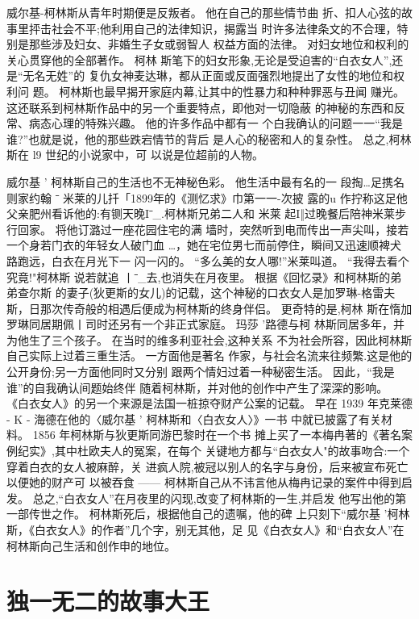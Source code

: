 \documentclass[portrait,a4paper]{article}
\begin{document}
威尔基-柯林斯从青年时期便是反叛者。 他在自己的那些情节曲
折、扣人心弦的故事里抨击社会不平;他利用自己的法律知识，揭露当
时许多法律条文的不合理，特别是那些涉及妇女、非婚生子女或弱智人
权益方面的法律。 对妇女地位和权利的关心贯穿他的全部著作。 柯林
斯笔下的妇女形象,无论是受迫害的“白衣女人”,还是“无名无姓”的
复仇女神麦达琳，都从正面或反面强烈地提出了女性的地位和权利问
题。 柯林斯也最早揭开家庭内幕,让其中的性暴力和种种罪恶与丑闻
赚光。 这还联系到柯林斯作品中的另一个重要特点，即他对一切隐蔽
的神秘的东西和反常、病态心理的特殊兴趣。 他的许多作品中都有一
个白我确认的问题一一“我是谁?”也就是说，他的那些跌宕情节的背后
是人心的秘密和人的复杂性。 总之,柯林斯在 l9 世纪的小说家中，可
以说是位超前的人物。

威尔基 ' 柯林斯自己的生活也不无神秘色彩。 他生活中最有名的一
段掏…足携名则家约翰 ˉ 米莱的儿扦「1899年的《测忆求》巾第一一-次披
露的u 作拧称这足他父亲肥州看诉他的:有铡天晚Iˉ_.柯林斯兄弟二人和
米莱 起I‖过晚餐后陪神米莱步行回家。 将他订潞过一座花园住宅的满
墙时，突然听到电而传出一声尖叫，接若一个身若门衣的年轻女人破门血
…，她在宅位男七而前停住，瞬间又迅速顺裨犬路跑远，白衣在月光下一
闪一闪的。 “多么美的女人哪!”米莱叫道。 “我得去看个究竟!"柯林斯
说若就追 丨ˉ_去,也消失在月夜里。 根据《回忆录》和柯林斯的弟弟查尔斯
的妻子(狄更斯的女儿)的记载，这个神秘的口衣女人是加罗琳-格雷夫
斯，日那次传奇般的相遇后便成为柯林斯的终身伴侣。 更奇特的是,柯林
斯在惰加罗琳同居期佩丨司时还另有一个非正式家庭。 玛莎 '路德与柯
林斯同居多年，并为他生了三个孩子。 在当时的维多利亚社会,这种关系
不为社会所容，因此柯林斯自己实际上过着三重生活。 一方面他是著名
作家，与社会名流来往频繁.这是他的公开身份;另一方面他同时又分别
跟两个情妇过着一种秘密生活。 因此，“我是谁”的自我确认间题始终伴
随着柯林斯，并对他的创作中产生了深深的影响。
《白衣女人》的另一个来源是法国一桩掠夺财产公案的记载。 早在
1939 年克莱德 - K - 海德在他的〈威尔基 ' 柯林斯和〈白衣女人〉》一书
中就已披露了有关材料。 1856 年柯林斯与狄更斯同游巴黎时在一个书
摊上买了一本梅冉著的《著名案例纪实》,其中杜欧夫人的冤案，在每个
关键地方都与“白衣女人"的故事吻合:一个穿着白衣的女人被麻醉，关
进疯人院,被冠以别人的名字与身份，后来被宣布死亡以便她的财产可
以被吞食 ------ 柯林斯自己从不讳言他从梅冉记录的案件中得到启发。
总之,“白衣女人”在月夜里的闪现,改变了柯林斯的一生,并启发
他写出他的第一部传世之作。 柯林斯死后，根据他自己的遗嘱，他的碑
上只刻下“威尔基 '柯林斯，《白衣女人》的作者”几个字，别无其他，足
见《白衣女人》和“白衣女人”在柯林斯向己生活和创作申的地位。

\section{独一无二的故事大王}
\end{document}
